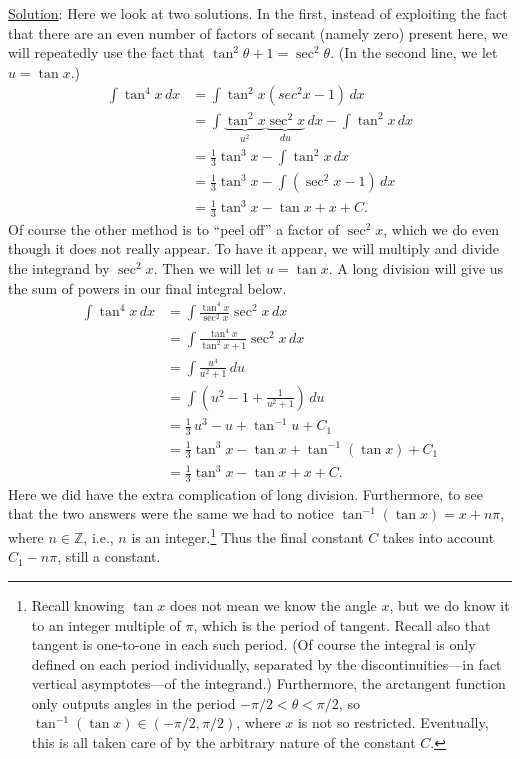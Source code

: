 \underline{Solution}:  Here we look at two solutions.
In the first, instead of exploiting the fact that there are an even
number of factors of secant (namely zero) present here,
we will repeatedly use the fact that $\tan^2\theta+1=\sec^2\theta$.
(In the second line, we let $u=\tan x$.)
\begin{align*}
\int\tan^4x\,dx&=\int\tan^2x\left(sec^2x-1\right)\,dx\\
               &=\int\underbrace{\tan^2x}_{u^2}\underbrace{\sec^2x}_{du}
                 \,dx -\int\tan^2x\,dx\\
               &=\frac13\tan^3x-\int\tan^2x\,dx\\
               &=\frac13\tan^3x-\int\left(\sec^2x-1\right)\,dx\\
               &=\frac13\tan^3x-\tan x+x+C.\end{align*}
Of course the other method is to ``peel off'' a factor of $\sec^2x$, which
we do even
though it does not really appear.  To have it appear, we will
multiply and divide the integrand by $\sec^2x$.  Then
we will let $u=\tan x$.
A long division will give us the sum of powers in our final integral
below.
\begin{align*}
\int\tan^4x\,dx&=\int\frac{\tan^4x}{\sec^2x}\sec^2x\,dx\\
               &=\int\frac{\tan^4x}{\tan^2x+1}\sec^2x\,dx\\
               &=\int\frac{u^4}{u^2+1}\,du\\
               &=\int\left(u^2-1+\frac1{u^2+1}\right)\,du\\
               &=\frac13\,u^3-u+\tan^{-1}u+C_1\\
               &=\frac13\tan^3x-\tan x+\tan^{-1}(\tan x)+C_1\\
               &=\frac13\tan^3x-\tan x+x+C.
\end{align*}
Here we did have the extra complication of long division.
Furthermore, to see that the two answers were the same we
had to notice
$\tan^{-1}(\tan x)=x+n\pi$, where $n\in\mathbb{Z}$, i.e., $n$ is
an integer.\footnote{
Recall knowing $\tan x$ does not mean we know
the angle $x$, but we do know it to an integer multiple of $\pi$,
which is the period of tangent.  Recall also that
tangent is one-to-one in each such period. (Of course the
integral is only defined on each period individually,
separated by the discontinuities---in fact vertical 
asymptotes---of the integrand.)  Furthermore, the arctangent
function only outputs angles in the period $-\pi/2<\theta<\pi/2$,
so $\tan^{-1}(\tan x)\in(-\pi/2,\pi/2)$, where $x$ is not so restricted.
Eventually, this is all taken care of by the arbitrary nature
of the constant $C$.%
}  Thus the final constant $C$ takes into account $C_1-n\pi$, still
a constant.
\eex

